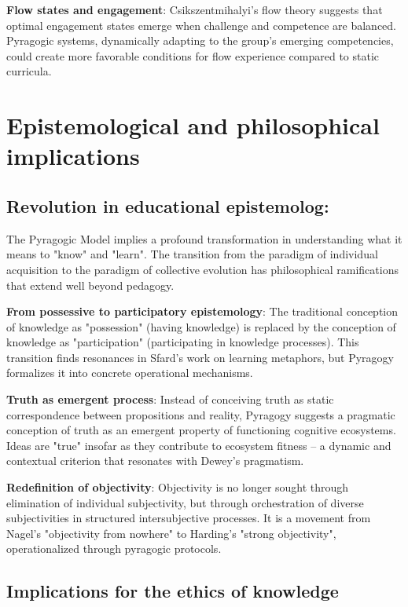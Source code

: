 \textbf{Flow states and engagement}:
Csikszentmihalyi's \cite{Csikszentmihalyi1990} flow theory suggests that optimal engagement states emerge when challenge and competence are balanced. Pyragogic systems, dynamically adapting to the group's emerging competencies, could create more favorable conditions for flow experience compared to static curricula.

\section{Epistemological and philosophical implications}
\subsection*{Revolution in educational epistemolog:}

The Pyragogic Model implies a profound transformation in understanding what it means to "know" and "learn". The transition from the paradigm of individual acquisition to the paradigm of collective evolution has philosophical ramifications that extend well beyond pedagogy.

\newpage

\textbf{From possessive to participatory epistemology}:
The traditional conception of knowledge as "possession" (having knowledge) is replaced by the conception of knowledge as "participation" (participating in knowledge processes). This transition finds resonances in Sfard's \cite{Sfard1998} work on learning metaphors, but Pyragogy formalizes it into concrete operational mechanisms.

\textbf{Truth as emergent process}:
Instead of conceiving truth as static correspondence between propositions and reality, Pyragogy suggests a pragmatic conception of truth as an emergent property of functioning cognitive ecosystems. Ideas are "true" insofar as they contribute to ecosystem fitness -- a dynamic and contextual criterion that resonates with Dewey's \cite{Dewey1938} pragmatism.

\textbf{Redefinition of objectivity}:
Objectivity is no longer sought through elimination of individual subjectivity, but through orchestration of diverse subjectivities in structured intersubjective processes. It is a movement from Nagel's \cite{Nagel1986} "objectivity from nowhere" to Harding's \cite{Harding1991} "strong objectivity", operationalized through pyragogic protocols.

\subsection{Implications for the ethics of knowledge}

